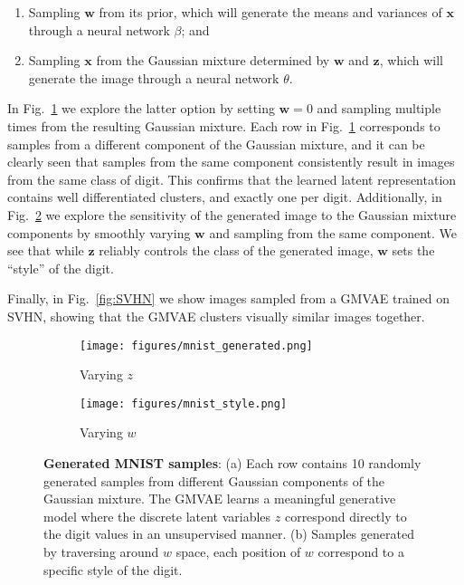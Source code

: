 \documentclass{article} \usepackage{iclr2017_conference,times}
\begin{document}
\begin{enumerate}
\item Sampling $\pmb{w}$ from its prior, which will generate the means and variances of $\pmb{x}$ through a neural network $\beta$; and
\item Sampling $\pmb{x}$ from the Gaussian mixture determined by $\pmb{w}$ and $\pmb{z}$, which will generate the image through a neural network $\theta$.
\end{enumerate}

In Fig.~\ref{fig:mnist_gen} we explore the latter option by setting $\pmb{w} = 0$ and sampling multiple times from the resulting Gaussian mixture. Each row in Fig.~\ref{fig:mnist_gen} corresponds to samples from a different component of the Gaussian mixture, and it can be clearly seen that samples from the same component consistently result in images from the same class of digit. This confirms that the learned latent representation contains well differentiated clusters, and exactly one per digit. Additionally, in Fig.~\ref{fig:mnist_style} we explore the sensitivity of the generated image to the Gaussian mixture components by smoothly varying $\pmb{w}$ and sampling from the same component. We see that while $\pmb{z}$ reliably controls the class of the generated image, $\pmb{w}$ sets the ``style'' of the digit.

Finally, in Fig.~\ref{fig:SVHN} we show images sampled from a GMVAE trained on SVHN, showing that the GMVAE clusters visually similar images together.

\begin{figure}[h]
\centering
	\begin{subfigure}{.5\textwidth}
		\centering
		\texttt{[image: figures/mnist\_generated.png]}
		\caption{Varying $z$}
        \label{fig:mnist_gen}
	\end{subfigure}\begin{subfigure}{.5\textwidth}
		\centering
		\texttt{[image: figures/mnist\_style.png]}
		\caption{Varying $w$}
        \label{fig:mnist_style}
	\end{subfigure}
\caption{\textbf{Generated MNIST samples}: (a) Each row contains 10 randomly generated samples from different Gaussian components of the Gaussian mixture. The GMVAE learns a meaningful generative model where the discrete latent variables $z$ correspond directly to the digit values in an unsupervised manner. (b) Samples generated by traversing around $w$ space, each position of $w$ correspond to a specific style of the digit.}
\label{fig:mnist}
\end{figure}
\end{document}
